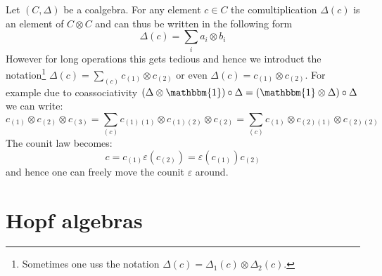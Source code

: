 	\begin{notation}
		Let $(C, \Delta)$ be a coalgebra. For any element $c\in C$ the comultiplication $\Delta(c)$ is an element of $C\otimes C$ and can thus be written in the following form \[\Delta(c) = \sum_ia_i\otimes b_i\]
		However for long operations this gets tedious and hence we introduct the notation\footnote{Sometimes one uss the notation $\Delta(c) = \Delta_1(c)\otimes\Delta_2(c)$.} $\Delta(c) = \sum_{(c)}c_{(1)}\otimes c_{(2)}$ or even $\Delta(c) = c_{(1)}\otimes c_{(2)}$. For example due to coassociativity $(\Delta\otimes\mathbbm{1})\circ\Delta = (\mathbbm{1}\otimes\Delta)\circ\Delta$ we can write: \[c_{(1)}\otimes c_{(2)}\otimes c_{(3)} = \sum_{(c)} c_{(1)(1)}\otimes c_{(1)(2)}\otimes c_{(2)} = \sum_{(c)} c_{(1)}\otimes c_{(2)(1)}\otimes c_{(2)(2)}\]
		The counit law becomes: \[c = c_{(1)}\varepsilon(c_{(2)}) = \varepsilon(c_{(1)})c_{(2)}\]
		and hence one can freely move the counit $\varepsilon$ around.
	\end{notation}

\section{Hopf algebras}

